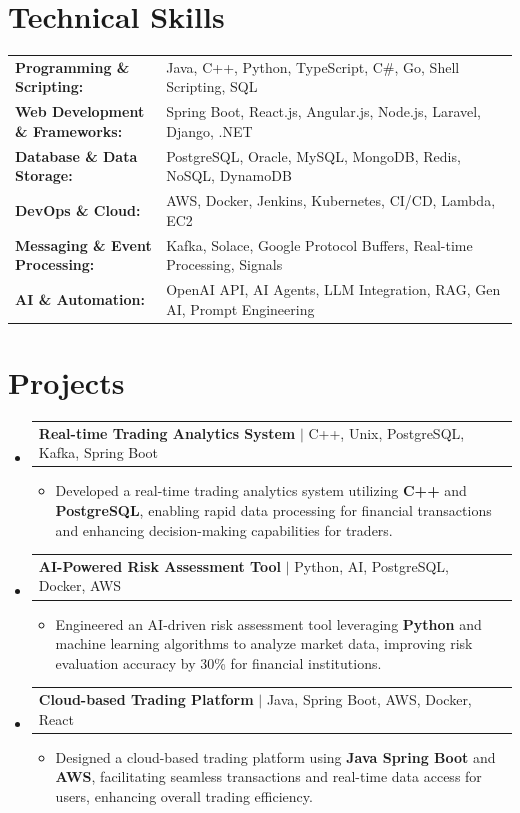 \documentclass[letterpaper,10pt]{article}
\makeatletter
\newcommand{\resumeItem}[1]{
  \item{\fontsize{8pt}{9pt}\selectfont
    #1 \vspace{-3pt}
  }
}
\newcommand{\resumeProjectHeading}[2]{
    \item
    \begin{tabular*}{1.001\textwidth}{l@{\extracolsep{\fill}}r}
      \fontsize{8.5pt}{10pt}#1 & \textbf{\fontsize{8.5pt}{10pt} #2}\\
    \end{tabular*}\vspace{-7pt}
}
\newcommand{\resumeSubHeadingListStart}{\begin{itemize}[leftmargin=0pt, label={}]}
\newcommand{\resumeSubHeadingListEnd}{\end{itemize}}
\newcommand{\resumeItemListStart}{\begin{itemize}[leftmargin=*]}
\newcommand{\resumeItemListEnd}{\end{itemize}\vspace{-5pt}}
\makeatother
\begin{document}
\section{Technical Skills}
        \vspace{-14pt}
        \begin{table}[h]
            \fontsize{8pt}{9pt}\selectfont
            \begin{tabular}{p{0.3\linewidth} p{0.7\linewidth}}
                \textbf{Programming \& Scripting:} & Java, C++, Python, TypeScript, C\#, Go, Shell Scripting, SQL \\
                \textbf{Web Development \& Frameworks:} & Spring Boot, React.js, Angular.js, Node.js, Laravel, Django, .NET \\
                \textbf{Database \& Data Storage:} & PostgreSQL, Oracle, MySQL, MongoDB, Redis, NoSQL, DynamoDB \\
                \textbf{DevOps \& Cloud:} & AWS, Docker, Jenkins, Kubernetes, CI/CD, Lambda, EC2 \\
                \textbf{Messaging \& Event Processing:} & Kafka, Solace, Google Protocol Buffers, Real-time Processing, Signals \\
                \textbf{AI \& Automation:} & OpenAI API, AI Agents, LLM Integration, RAG, Gen AI, Prompt Engineering \\
            \end{tabular}
        \end{table}
 \vspace{-18pt}

\section{Projects}
    \vspace{-5pt}
    \resumeSubHeadingListStart
          \resumeProjectHeading
            {\textbf{Real-time Trading Analytics System} $|$ C++, Unix, PostgreSQL, Kafka, Spring Boot}{}
            \resumeItemListStart
                \resumeItem{Developed a real-time trading analytics system utilizing \textbf{C++} and \textbf{PostgreSQL}, enabling rapid data processing for financial transactions and enhancing decision-making capabilities for traders.}
            \resumeItemListEnd
        \vspace{-12pt}
    
        \resumeProjectHeading
            {\textbf{AI-Powered Risk Assessment Tool} $|$ Python, AI, PostgreSQL, Docker, AWS}{}
        \resumeItemListStart
                \resumeItem{Engineered an AI-driven risk assessment tool leveraging \textbf{Python} and machine learning algorithms to analyze market data, improving risk evaluation accuracy by 30\% for financial institutions.}
        \resumeItemListEnd
      \vspace{-12pt}
      \resumeProjectHeading
        {\textbf{Cloud-based Trading Platform} $|$ Java, Spring Boot, AWS, Docker, React}{}
    \resumeItemListStart
            \resumeItem{Designed a cloud-based trading platform using \textbf{Java Spring Boot} and \textbf{AWS}, facilitating seamless transactions and real-time data access for users, enhancing overall trading efficiency.}
    \resumeItemListEnd
    \resumeSubHeadingListEnd
\end{document}
